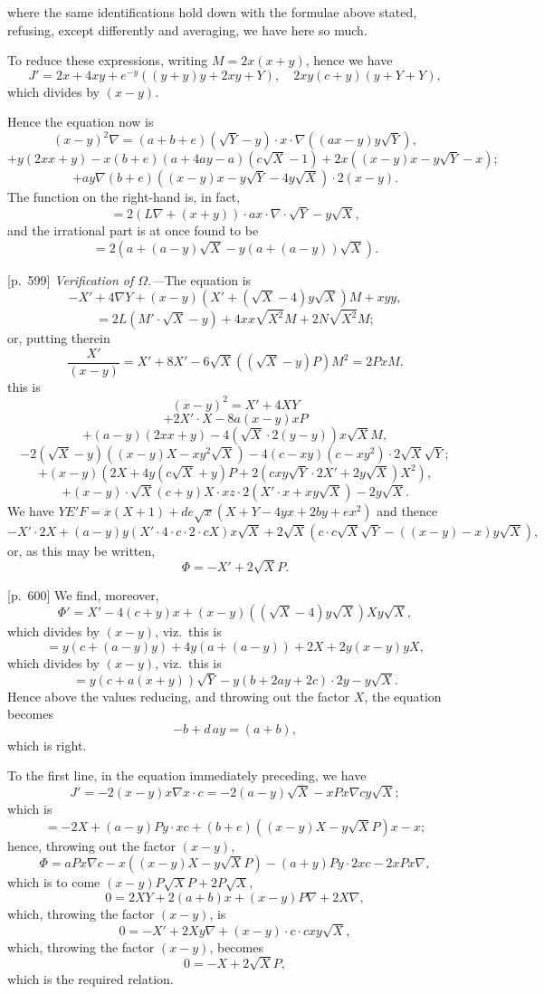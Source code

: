 \documentclass[11pt,a4paper]{book}
\begin{document}
where the same identifications hold down with the formulae above stated, refusing, except differently and averaging, we have here so much.

To reduce these expressions, writing $M = 2x(x + y)$, hence we have
\[
J' = 2x + 4xy + e^{-y}((y + y) y + 2xy + Y), \quad 2x y(c + y)(y + Y + Y),
\]
which divides by $(x - y)$.

Hence the equation now is
\[
(x - y)^2 \nabla = (a + b + e)(\sqrt{Y} - y) \cdot x \cdot \nabla((a x - y) y \sqrt{Y}),
\]
\[
+ y(2x x + y) - x(b + e)(a + 4ay - a)(c\sqrt{X} - 1) + 2x((x - y)x - y\sqrt{Y} - x);
\]
\[
+ ay \nabla (b + e)((x - y)x - y\sqrt{Y} - 4y\sqrt{X}) \cdot 2(x - y).
\]
The function on the right-hand is, in fact,
\[
= 2(L\nabla + (x + y)) \cdot a x \cdot \nabla \cdot \sqrt{Y} - y\sqrt{X},
\]
and the irrational part is at once found to be
\[
= 2(a + (a - y)\sqrt{X} - y(a + (a - y))\sqrt{X}).
\]

\bigskip

[p.~599] \textit{Verification of $\Omega$.---}The equation is
\[
-X' + 4\nabla Y + (x - y) (X' + (\sqrt{X} - 4) y\sqrt{X}) M + xy y,
\]
\[
= 2L(M' \cdot \sqrt{X} - y) + 4xx\sqrt{X^2}M + 2N\sqrt{X^2}M;
\]
or, putting therein
\[
\frac{X'}{(x - y)} = X' + 8X' - 6\sqrt{X}((\sqrt{X} - y)P) M^2 = 2P x M.
\]
this is
\[
(x - y)^2 = X' + 4XY
\]
\[
+ 2X' \cdot X - 8a(x - y)x P
\]
\[
+ (a - y)(2x x + y) - 4(\sqrt{X} \cdot 2(y - y)) x\sqrt{X}M,
\]
\[
-2(\sqrt{X} - y)((x - y)X - xy^2 \sqrt{X}) - 4(c - x y)(c - x y^2) \cdot 2\sqrt{X}\sqrt{Y};
\]
\[
+ (x - y)(2X + 4y(c\sqrt{X} + y)P + 2(c x y\sqrt{Y} \cdot 2X' + 2y\sqrt{X})X^2),
\]
\[
+ (x - y) \cdot \sqrt{X}(c + y)X \cdot xz \cdot 2 (X' \cdot x + x y\sqrt{X}) - 2y\sqrt{X}.
\]
We have $YE'F = x(X + 1) + d e\sqrt{x}(X + Y - 4yx + 2by + ex^2)$
and thence
\[
-X' \cdot 2X + (a - y)y(X' \cdot 4 \cdot c \cdot 2 \cdot c X)x\sqrt{X} + 2\sqrt{X}(c \cdot c\sqrt{X}\sqrt{Y} - ((x - y) - x)y\sqrt{X}),
\]
or, as this may be written,
\[
\Phi = - X' + 2\sqrt{X}P.
\]

\bigskip

[p.~600] We find, moreover,
\[
\Phi' = X' - 4(c + y)x + (x - y)((\sqrt{X} - 4)y\sqrt{X})X y \sqrt{X},
\]
which divides by $(x - y)$, viz.\ this is
\[
= y(c + (a - y)y) + 4y(a + (a - y)) + 2X + 2y(x - y)yX,
\]
which divides by $(x - y)$, viz.\ this is
\[
= y(c + a(x + y))\sqrt{Y} - y(b + 2ay + 2c) \cdot 2y - y\sqrt{X}.
\]
Hence above the values reducing, and throwing out the factor $X$, the equation becomes
\[
- b + d\,a y = (a + b),
\]
which is right.

To the first line, in the equation immediately preceding, we have
\[
J' = -2(x - y)x \nabla x \cdot c = -2(a - y) \sqrt{X} - x P x \nabla c y \sqrt{X}; \]
which is
\[
= -2X + (a - y)P y \cdot xc + (b + e)((x - y)X - y\sqrt{X}P)x - x;
\]
hence, throwing out the factor $(x - y)$,
\[
\Phi = a P x \nabla c - x((x - y)X - y\sqrt{X}P) - (a + y)P y \cdot 2xc - 2 x P x \nabla,
\]
which is to come $(x - y)P\sqrt{X} P + 2 P\sqrt{X}$,
\[
0 = 2 X Y + 2(a + b)x + (x - y)P\nabla + 2 X\nabla,
\]
which, throwing the factor $(x - y)$, is
\[
0 = -X' + 2X y \nabla + (x - y) \cdot c \cdot c x y \sqrt{X},
\]
which, throwing the factor $(x - y)$, becomes
\[
0 = -X + 2\sqrt{X}P,
\]
which is the required relation.
\clearpage
\end{document}
